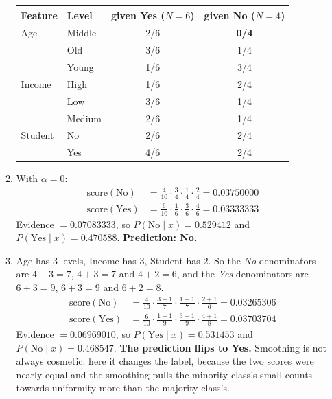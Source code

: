 \documentclass[11pt]{article}
\begin{document}
\begin{enumerate}[leftmargin=*, itemsep=0.7em]
\begin{enumerate}[label=(\alph*)]
      \begin{center}\small
      \begin{tabular}{@{}llcc@{}}
      \toprule
      Feature & Level & given Yes ($N=6$) & given No ($N=4$)\\
      \midrule
      Age & Middle & 2/6 & \textbf{0/4}\\
          & Old    & 3/6 & 1/4\\
          & Young  & 1/6 & 3/4\\
      \midrule
      Income & High   & 1/6 & 2/4\\
             & Low    & 3/6 & 1/4\\
             & Medium & 2/6 & 1/4\\
      \midrule
      Student & No  & 2/6 & 2/4\\
              & Yes & 4/6 & 2/4\\
      \bottomrule
      \end{tabular}
      \end{center}
    \item With $\alpha = 0$:
      \begin{align*}
        \text{score}(\text{No})
          &= \tfrac{4}{10}\cdot\tfrac{3}{4}\cdot\tfrac{1}{4}
             \cdot\tfrac{2}{4} = \mathbf{0.03750000}\\
        \text{score}(\text{Yes})
          &= \tfrac{6}{10}\cdot\tfrac{1}{6}\cdot\tfrac{3}{6}
             \cdot\tfrac{4}{6} = \mathbf{0.03333333}
      \end{align*}
      Evidence $= 0.07083333$, so $P(\text{No} \mid x) = \mathbf{0.529412}$
      and $P(\text{Yes} \mid x) = \mathbf{0.470588}$. \textbf{Prediction:
      No.}
    \item Age has $3$ levels, Income has $3$, Student has $2$. So the
      \emph{No} denominators are $4+3 = 7$, $4+3 = 7$ and $4+2 = 6$, and the
      \emph{Yes} denominators are $6+3 = 9$, $6+3 = 9$ and $6+2 = 8$.
      \begin{align*}
        \text{score}(\text{No})
          &= \tfrac{4}{10}\cdot\tfrac{3+1}{7}\cdot\tfrac{1+1}{7}
             \cdot\tfrac{2+1}{6} = \mathbf{0.03265306}\\
        \text{score}(\text{Yes})
          &= \tfrac{6}{10}\cdot\tfrac{1+1}{9}\cdot\tfrac{3+1}{9}
             \cdot\tfrac{4+1}{8} = \mathbf{0.03703704}
      \end{align*}
      Evidence $= 0.06969010$, so $P(\text{Yes} \mid x) = \mathbf{0.531453}$
      and $P(\text{No} \mid x) = \mathbf{0.468547}$. \textbf{The prediction
      flips to Yes.} Smoothing is not always cosmetic: here it changes the
      label, because the two scores were nearly equal and the smoothing
      pulls the minority class's small counts towards uniformity more than
      the majority class's.


\end{enumerate}
\end{enumerate}
\end{document}
